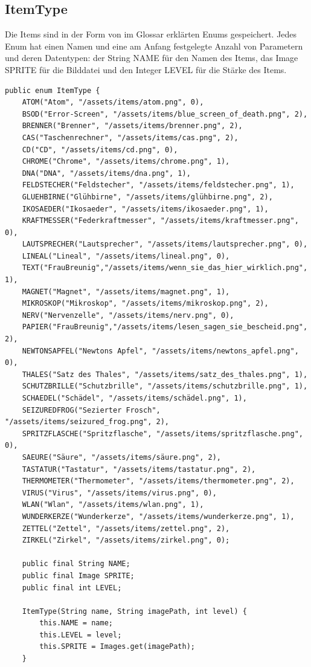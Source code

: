 \subsection{ItemType}
Die Items sind in der Form von im Glossar erklärten Enums gespeichert. Jedes Enum hat einen Namen und eine am Anfang festgelegte Anzahl von Parametern und deren Datentypen: der String NAME für den Namen des Items, das Image SPRITE für die Bilddatei und den Integer LEVEL für die Stärke des Items. 

\begin{lstlisting}
public enum ItemType {
    ATOM("Atom", "/assets/items/atom.png", 0),
    BSOD("Error-Screen", "/assets/items/blue_screen_of_death.png", 2),
    BRENNER("Brenner", "/assets/items/brenner.png", 2),
    CAS("Taschenrechner", "/assets/items/cas.png", 2),
    CD("CD", "/assets/items/cd.png", 0),
    CHROME("Chrome", "/assets/items/chrome.png", 1),
    DNA("DNA", "/assets/items/dna.png", 1),
    FELDSTECHER("Feldstecher", "/assets/items/feldstecher.png", 1),
    GLUEHBIRNE("Glühbirne", "/assets/items/glühbirne.png", 2),
    IKOSAEDER("Ikosaeder", "/assets/items/ikosaeder.png", 1),
    KRAFTMESSER("Federkraftmesser", "/assets/items/kraftmesser.png", 0),
    LAUTSPRECHER("Lautsprecher", "/assets/items/lautsprecher.png", 0),
    LINEAL("Lineal", "/assets/items/lineal.png", 0),
    TEXT("FrauBreunig","/assets/items/wenn_sie_das_hier_wirklich.png", 1),
    MAGNET("Magnet", "/assets/items/magnet.png", 1),
    MIKROSKOP("Mikroskop", "/assets/items/mikroskop.png", 2),
    NERV("Nervenzelle", "/assets/items/nerv.png", 0),
    PAPIER("FrauBreunig","/assets/items/lesen_sagen_sie_bescheid.png", 2),
    NEWTONSAPFEL("Newtons Apfel", "/assets/items/newtons_apfel.png", 0),
    THALES("Satz des Thales", "/assets/items/satz_des_thales.png", 1),
    SCHUTZBRILLE("Schutzbrille", "/assets/items/schutzbrille.png", 1),
    SCHAEDEL("Schädel", "/assets/items/schädel.png", 1),
    SEIZUREDFROG("Sezierter Frosch", "/assets/items/seizured_frog.png", 2),
    SPRITZFLASCHE("Spritzflasche", "/assets/items/spritzflasche.png", 0),
    SAEURE("Säure", "/assets/items/säure.png", 2),
    TASTATUR("Tastatur", "/assets/items/tastatur.png", 2),
    THERMOMETER("Thermometer", "/assets/items/thermometer.png", 2),
    VIRUS("Virus", "/assets/items/virus.png", 0),
    WLAN("Wlan", "/assets/items/wlan.png", 1),
    WUNDERKERZE("Wunderkerze", "/assets/items/wunderkerze.png", 1),
    ZETTEL("Zettel", "/assets/items/zettel.png", 2),
    ZIRKEL("Zirkel", "/assets/items/zirkel.png", 0);
        
    public final String NAME;
    public final Image SPRITE;
    public final int LEVEL;
    
    ItemType(String name, String imagePath, int level) {
        this.NAME = name;
        this.LEVEL = level;
        this.SPRITE = Images.get(imagePath);
    }
\end{lstlisting}


